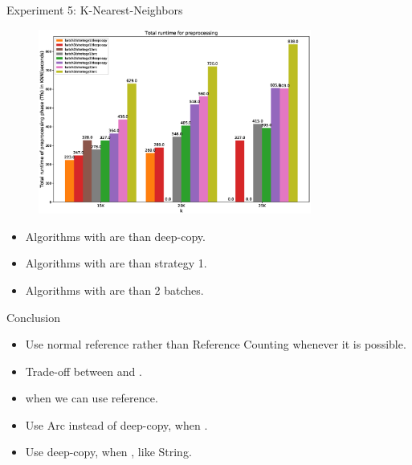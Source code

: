 \documentclass[9pt]{beamer}
\begin{document}
\begin{frame}[fragile]{Experiment 5: K-Nearest-Neighbors}

    \begin{figure}[hp]
        \centering
        \begin{center}
                \includegraphics[width=0.8\textwidth]{images/preprocessing.eps}
                \captionsetup{labelformat=empty}
        \end{center}
    \end{figure}
    \begin{itemize}
        \item Algorithms with  are  than deep-copy.
        \item Algorithms with  are  than strategy 1.
        \item Algorithms with  are  than 2 batches.
    \end{itemize}
\end{frame}


\begin{frame}[fragile]{Conclusion}
    \begin{itemize}
        \item Use normal reference rather than Reference Counting whenever it is possible.
        \item Trade-off between  and .
        \item {} when we can use reference.
        \item Use Arc instead of deep-copy, when .
        \item Use deep-copy, when , like String.
    \end{itemize}
\end{frame}
\end{document}
